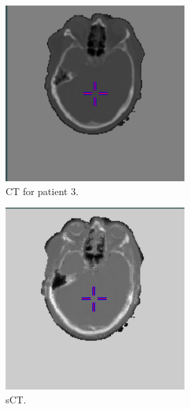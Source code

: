 \begin{figure}
\begin{subfigure}[b]{0.3\textwidth}
        \includegraphics[width=0.75\textwidth]{colager/loocv_ct/loocv_010850_ct.png}
        \caption{CT for patient 3.}
        \label{col:loocv_ct_pat3_ct}
    \end{subfigure}\hfill
    \begin{subfigure}[b]{0.3\textwidth}
        \centering
        \includegraphics[width=0.75\textwidth]{colager/loocv_ct/loocv_010850_sct.png}
        \caption{sCT.}
        \label{col:loocv_ct_pat3_sct}
    \end{subfigure}\hfill
    \begin{subfigure}[b]{0.3\textwidth}
        \centering

\end{subfigure}
\end{figure}
